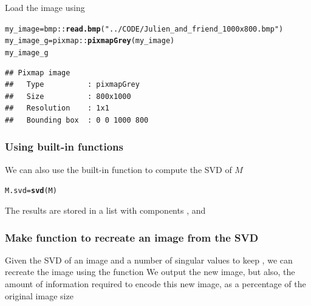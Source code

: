 \documentclass[aspectratio=169]{beamer}\usepackage[]{graphicx}\usepackage[]{xcolor}
\makeatletter
\newcommand{\hlsng}[1]{\textcolor[rgb]{0.192,0.494,0.8}{#1}}%
\newcommand{\hlopt}[1]{\textcolor[rgb]{0,0,0}{#1}}%
\newcommand{\hldef}[1]{\textcolor[rgb]{0.345,0.345,0.345}{#1}}%
\newcommand{\hlkwb}[1]{\textcolor[rgb]{0.69,0.353,0.396}{#1}}%
\newcommand{\hlkwd}[1]{\textcolor[rgb]{0.737,0.353,0.396}{\textbf{#1}}}%
\newenvironment{kframe}{%
 \def\at@end@of@kframe{}%
 \ifinner\ifhmode%
  \def\at@end@of@kframe{\end{minipage}}%
  \begin{minipage}{\columnwidth}%
 \fi\fi%
 \def\FrameCommand##1{\hskip\@totalleftmargin \hskip-\fboxsep
 \colorbox{shadecolor}{##1}\hskip-\fboxsep
     \hskip-\linewidth \hskip-\@totalleftmargin \hskip\columnwidth}%
 \MakeFramed {\advance\hsize-\width
   \@totalleftmargin\z@ \linewidth\hsize
   \@setminipage}}%
 {\par\unskip\endMakeFramed%
 \at@end@of@kframe}
\newenvironment{knitrout}{}{} %
\makeatother
\begin{document}
\begin{frame}[fragile]
Load the image using 
\begin{knitrout}
\color{fgcolor}\begin{kframe}
\begin{alltt}
\hldef{my_image} \hlkwb{=} \hldef{bmp}\hlopt{::}\hlkwd{read.bmp}\hldef{(}\hlsng{"../CODE/Julien_and_friend_1000x800.bmp"}\hldef{)}
\hldef{my_image_g} \hlkwb{=} \hldef{pixmap}\hlopt{::}\hlkwd{pixmapGrey}\hldef{(my_image)}
\hldef{my_image_g}
\end{alltt}
\begin{verbatim}
## Pixmap image
##   Type          : pixmapGrey 
##   Size          : 800x1000 
##   Resolution    : 1x1 
##   Bounding box  : 0 0 1000 800
\end{verbatim}
\end{kframe}
\end{knitrout}
\end{frame}


\begin{frame}[fragile]\frametitle{Using built-in functions}
We can also use the built-in function  to compute the SVD of $M$
\vfill
\begin{knitrout}
\color{fgcolor}\begin{kframe}
\begin{alltt}
\hldef{M.svd} \hlkwb{=} \hlkwd{svd}\hldef{(M)}
\end{alltt}
\end{kframe}
\end{knitrout}
\vfill
The results are stored in a list with components ,  and 
\end{frame}

\begin{frame}\frametitle{Make function to recreate an image from the SVD}
Given the SVD  of an image and a number of singular values to keep , we can recreate the image using the function 
\vfill
We output the new image, but also, the amount of information required to encode this new image, as a percentage of the original image size
\end{frame}
\end{document}
